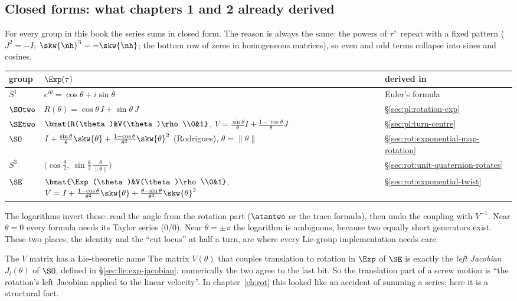\subsection{Closed forms: what chapters 1 and 2 already derived}\label{sec:lie:closed-forms}

For every group in this book the series sums in closed form. The reason is always the same: the powers of $\tau^\wedge$ repeat with a fixed pattern ($J^2=-I$; $\skw{\nh}^3=-\skw{\nh}$; the bottom row of zeros in homogeneous matrices), so even and odd terms collapse into sines and cosines.
\begin{center}\small
\renewcommand{\arraystretch}{1.3}
\begin{tabularx}{\linewidth}{@{}l>{\raggedright\arraybackslash}X l@{}}\toprule
group & $\Exp(\tau)$ & derived in\\\midrule
$S^1$ & $e^{i\theta}=\cos\theta+i\sin\theta$ & Euler's formula\\
$\SOtwo$ & $R(\theta)=\cos\theta\,I+\sin\theta\,J$ & \S\ref{sec:pl:rotation-exp}\\
$\SEtwo$ & $\bmat{R(\theta)&V(\theta)\rho\\0&1}$, $V=\frac{\sin\theta}\theta I+\frac{1-\cos\theta}\theta J$ & \S\ref{sec:pl:turn-centre}\\
$\SO$ & $I+\frac{\sin\theta}\theta\skw{\theta}+\frac{1-\cos\theta}{\theta^2}\skw{\theta}^2$ (Rodrigues), $\theta=\|\theta\|$ & \S\ref{sec:rot:exponential-map-rotation}\\
$S^3$ & $\big(\cos\frac\theta2,\ \sin\frac\theta2\,\frac{\theta}{\|\theta\|}\big)$ & \S\ref{sec:rot:unit-quaternion-rotates}\\
$\SE$ & $\bmat{\Exp(\theta)&V(\theta)\rho\\0&1}$, $V=I+\frac{1-\cos\theta}{\theta^2}\skw{\theta}+\frac{\theta-\sin\theta}{\theta^3}\skw{\theta}^2$ & \S\ref{sec:rot:exponential-twist}\\\bottomrule
\end{tabularx}
\end{center}
The logarithms invert these: read the angle from the rotation part ($\atantwo$ or the trace formula), then undo the coupling with $V^{-1}$. Near $\theta=0$ every formula needs its Taylor series (0/0). Near $\theta=\pm\pi$ the logarithm is ambiguous, because two equally short generators exist. These two places, the identity and the ``cut locus'' at half a turn, are where every Lie-group implementation needs care.

\begin{noteb}{The $V$ matrix has a Lie-theoretic name}
The matrix $V(\theta)$ that couples translation to rotation in $\Exp$ of $\SE$ is exactly the \emph{left Jacobian} $J_l(\theta)$ of $\SO$, defined in \S\ref{sec:lie:exp-jacobian}; numerically the two agree to the last bit. So the translation part of a screw motion is ``the rotation's left Jacobian applied to the linear velocity''. In chapter~\ref{ch:rot} this looked like an accident of summing a series; here it is a structural fact.
\end{noteb}
